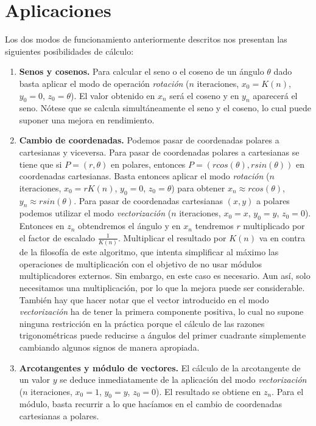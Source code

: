 \documentclass[12pt, a4paper]{article}
\begin{document}
 \section{Aplicaciones}
 Los dos modos de funcionamiento anteriormente descritos nos presentan las siguientes posibilidades de cálculo:
 \begin{enumerate}
    \item \textbf{Senos y cosenos.}
    Para calcular el seno o el coseno de un ángulo $\theta$ dado basta aplicar el modo de operación \textit{rotación} ($n$ iteraciones, $x_0=K(n)$, $y_0=0$, $z_0=\theta$). El valor obtenido en $x_n$ será el coseno y en $y_n$ aparecerá el seno. Nótese que se calcula simultáneamente el seno y el coseno, lo cual puede suponer una mejora en rendimiento.
    \item \textbf{Cambio de coordenadas.}
    Podemos pasar de coordenadas polares a cartesianas y viceversa. Para pasar de coordenadas polares a cartesianas se tiene que si $P=(r,\theta)$ en polares, entonces $P=(rcos(\theta), rsin(\theta))$ en coordenadas cartesianas. Basta entonces aplicar el modo \textit{rotación} ($n$ iteraciones, $x_0=rK(n)$, $y_0=0$, $z_0=\theta$) para obtener $x_n\approx rcos(\theta)$, $y_n\approx rsin(\theta)$.
 Para pasar de coordenadas cartesianas $(x,y)$ a polares podemos utilizar el modo \textit{vectorización} ($n$ iteraciones, $x_0=x$, $y_0=y$, $z_0=0$). Entonces en $z_n$ obtendremos el ángulo y en $x_n$ tendremos $r$ multiplicado por el factor de escalado $\frac{1}{K(n)}$. Multiplicar el resultado por $K(n)$ va en contra de la filosofía de este algoritmo, que intenta simplificar al máximo las operaciones de multiplicación con el objetivo de no usar módulos multiplicadores externos. Sin embargo, en este caso es necesario. Aun así, solo necesitamos una multiplicación, por lo que la mejora puede ser considerable. También hay que hacer notar que el vector introducido en el modo \textit{vectorización} ha de tener la primera componente positiva, lo cual no supone ninguna restricción en la práctica porque el cálculo de las razones trigonométricas puede reducirse a ángulos del primer cuadrante simplemente cambiando algunos signos de manera apropiada.
   \item \textbf{Arcotangentes y módulo de vectores.}
   El cálculo de la arcotangente de un valor $y$ se deduce inmediatamente de la aplicación del modo \textit{vectorización} ($n$ iteraciones, $x_0=1$, $y_0=y$, $z_0=0$). El resultado se obtiene en $z_n$. Para el módulo, basta recurrir a lo que hacíamos en el cambio de coordenadas cartesianas a polares.
\end{enumerate}
\end{document}
